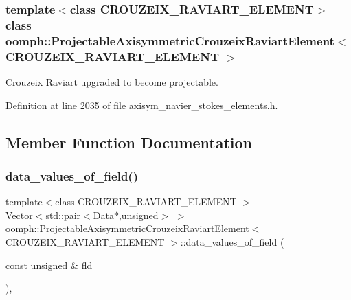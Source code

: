 \subsubsection*{template$<$class C\+R\+O\+U\+Z\+E\+I\+X\+\_\+\+R\+A\+V\+I\+A\+R\+T\+\_\+\+E\+L\+E\+M\+E\+NT$>$\newline
class oomph\+::\+Projectable\+Axisymmetric\+Crouzeix\+Raviart\+Element$<$ C\+R\+O\+U\+Z\+E\+I\+X\+\_\+\+R\+A\+V\+I\+A\+R\+T\+\_\+\+E\+L\+E\+M\+E\+N\+T $>$}

Crouzeix Raviart upgraded to become projectable. 

Definition at line 2035 of file axisym\+\_\+navier\+\_\+stokes\+\_\+elements.\+h.



\subsection{Member Function Documentation}
\mbox{\label{classoomph_1_1ProjectableAxisymmetricCrouzeixRaviartElement_ae3768470d408e2d40f408e58d28792c2}} 
\subsubsection{\texorpdfstring{data\+\_\+values\+\_\+of\+\_\+field()}{data\_values\_of\_field()}}
{\footnotesize\ttfamily template$<$class C\+R\+O\+U\+Z\+E\+I\+X\+\_\+\+R\+A\+V\+I\+A\+R\+T\+\_\+\+E\+L\+E\+M\+E\+NT $>$ \\
\hyperlink{classoomph_1_1Vector}{Vector}$<$std\+::pair$<$\hyperlink{classoomph_1_1Data}{Data}$\ast$,unsigned$>$ $>$ \hyperlink{classoomph_1_1ProjectableAxisymmetricCrouzeixRaviartElement}{oomph\+::\+Projectable\+Axisymmetric\+Crouzeix\+Raviart\+Element}$<$ C\+R\+O\+U\+Z\+E\+I\+X\+\_\+\+R\+A\+V\+I\+A\+R\+T\+\_\+\+E\+L\+E\+M\+E\+NT $>$\+::data\+\_\+values\+\_\+of\+\_\+field (\begin{DoxyParamCaption}\item[{const unsigned \&}]{fld }\end{DoxyParamCaption})\hspace{0.3cm}{\ttfamily [inline]}, {\ttfamily [virtual]}}



